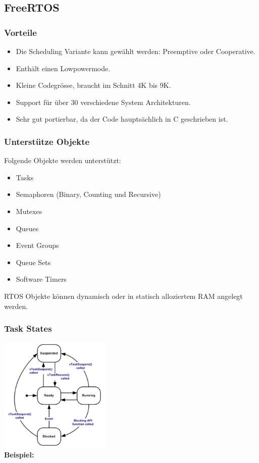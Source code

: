 \subsection{FreeRTOS}
\subsubsection{Vorteile}
\begin{itemize}
    \item Die Scheduling Variante kann gewählt werden: Preemptive oder Cooperative.
    \item Enthält einen Lowpowermode.
    \item Kleine Codegrösse, braucht im Schnitt 4K bis 9K.
    \item Support für über 30 verschiedene System Architekturen.
    \item Sehr gut portierbar, da der Code hauptsächlich in C geschrieben ist.
\end{itemize}

\subsubsection{Unterstütze Objekte}
Folgende Objekte werden unterstützt:
\begin{multicols}{2}
    \begin{itemize}
        \item Tasks
        \item Semaphoren (Binary, Counting und Recursive)
        \item Mutexes
        \item Queues
        \item Event Groups
        \item Queue Sets
        \item Software Timers
    \end{itemize}
\end{multicols}
RTOS Objekte können dynamisch oder in statisch alloziertem RAM angelegt werden.

\subsubsection{Task States}
\includegraphics[width=0.4\textwidth]{images/Betriebssysteme/freertos_taskstates.png}\\
\textbf{Beispiel:}


